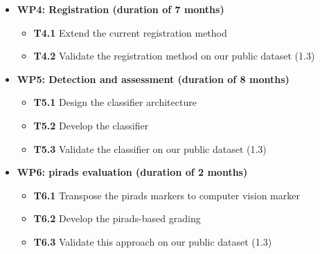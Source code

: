 \begin{itemize}[noitemsep]
\begin{itemize}
  \end{itemize}
\item[] \textbf{WP4: Registration (duration of 7 months)}
  \begin{itemize}[noitemsep,nolistsep]
  \item[] \textbf{T4.1} Extend the current registration method
  \item[] \textbf{T4.2} Validate the registration method on our public dataset (1.3)
  \end{itemize}
\item[] \textbf{WP5: Detection and assessment (duration of 8 months)}
  \begin{itemize}[noitemsep,nolistsep]
  \item[] \textbf{T5.1} Design the classifier architecture
  \item[] \textbf{T5.2} Develop the classifier
  \item[] \textbf{T5.3} Validate the classifier on our public dataset (1.3)
  \end{itemize}
\item[] \textbf{WP6: \ac{pirads} evaluation (duration of 2 months)}
  \begin{itemize}[noitemsep,nolistsep]
  \item[] \textbf{T6.1} Transpose the \ac{pirads} markers to computer vision marker
  \item[] \textbf{T6.2} Develop the \ac{pirads}-based grading
  \item[] \textbf{T6.3} Validate this approach on our public dataset (1.3)
  \end{itemize}
\end{itemize}


